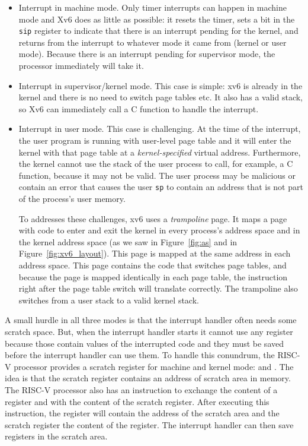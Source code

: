 \begin{itemize}
  
\item Interrupt in machine mode.  Only timer interrupts can happen in
  machine mode and Xv6 does as little as possible: it resets the
  timer, sets a bit in the \lstinline{sip} register to indicate that
  there is an interrupt pending for the kernel, and returns from the
  interrupt to whatever mode it came from (kernel or user mode).
  Because there is an interrupt pending for supervisor mode, the
  processor immediately will take it.

\item Interrupt in supervisor/kernel mode.  This case is simple: xv6
  is already in the kernel and there is no need to switch page tables
  etc. It also has a valid stack, so Xv6 can immediately call a C
  function to handle the interrupt.

\item Interrupt in user mode. This case is challenging.  At the time
  of the interrupt, the user program is running with user-level page
  table and it will enter the kernel with that page table at a
  \textit{kernel-specified} virtual address. Furthermore, the kernel
  cannot use the stack of the user process to call, for example, a C
  function, because it may not be valid.  The user process may be
  malicious or contain an error that causes the user \texttt{sp} to
  contain an address that is not part of the process's user memory.

  To addresses these challenges, xv6 uses a
  \textit{trampoline} page.  It maps a page with
  code to enter and exit the kernel in every process's address space
  and in the kernel address space (as we saw in Figure~\ref{fig:as}
  and in Figure~\ref{fig:xv6_layout}).  This page is mapped at the
  same address in each address space.  This page contains the code
  that switches page tables, and because the page is mapped
  identically in each page table, the instruction right after the page
  table switch will translate correctly.  The trampoline also switches
  from a user stack to a valid kernel stack.

\end{itemize}

A small hurdle in all three modes is that the interrupt handler
often needs some scratch space. But, when the interrupt handler starts
it cannot use any register because those contain values of the
interrupted code and they must be saved before the interrupt handler
can use them. To handle this conundrum, the RISC-V processor provides
a scratch register for machine and kernel mode:
 and
.  The idea is
that the scratch register contains an address of scratch area in
memory.  The RISC-V processor also has an instruction to exchange the
content of a register and with the content of the scratch
register. After executing this instruction, the register will contain
the address of the scratch area and the scratch register the content
of the register. The interrupt handler can then save registers in the
scratch area.

